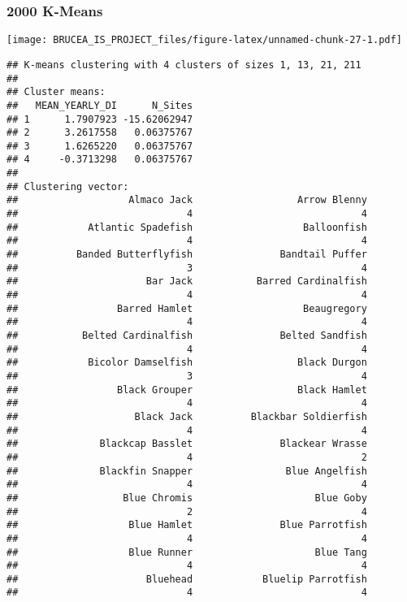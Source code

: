 \documentclass[
]{article}
\begin{document}
\hypertarget{k-means-1}{%
\subsubsection{2000 K-Means}\label{k-means-1}}

\texttt{[image: BRUCEA\_IS\_PROJECT\_files/figure-latex/unnamed-chunk-27-1.pdf]}

\begin{verbatim}
## K-means clustering with 4 clusters of sizes 1, 13, 21, 211
## 
## Cluster means:
##   MEAN_YEARLY_DI      N_Sites
## 1      1.7907923 -15.62062947
## 2      3.2617558   0.06375767
## 3      1.6265220   0.06375767
## 4     -0.3713298   0.06375767
## 
## Clustering vector:
##                   Almaco Jack                  Arrow Blenny 
##                             4                             4 
##            Atlantic Spadefish                   Balloonfish 
##                             4                             4 
##          Banded Butterflyfish               Bandtail Puffer 
##                             3                             4 
##                      Bar Jack           Barred Cardinalfish 
##                             4                             4 
##                 Barred Hamlet                   Beaugregory 
##                             4                             4 
##           Belted Cardinalfish               Belted Sandfish 
##                             4                             4 
##            Bicolor Damselfish                  Black Durgon 
##                             3                             4 
##                 Black Grouper                  Black Hamlet 
##                             4                             4 
##                    Black Jack          Blackbar Soldierfish 
##                             4                             4 
##              Blackcap Basslet               Blackear Wrasse 
##                             4                             2 
##              Blackfin Snapper                Blue Angelfish 
##                             4                             4 
##                  Blue Chromis                     Blue Goby 
##                             2                             4 
##                   Blue Hamlet               Blue Parrotfish 
##                             4                             4 
##                   Blue Runner                     Blue Tang 
##                             4                             4 
##                      Bluehead            Bluelip Parrotfish 
##                             4                             4 

\end{verbatim}
\end{document}
